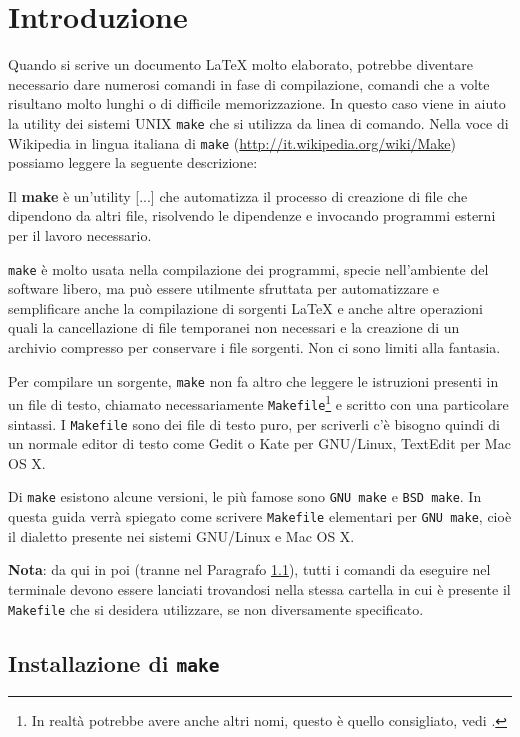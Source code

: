\cleardoublepage
\chapter{Introduzione}
\label{cha:introduzione}

Quando si scrive un documento \LaTeX{}
molto elaborato, potrebbe diventare necessario dare numerosi comandi in fase di
compilazione, comandi che a volte risultano molto lunghi o di difficile
memorizzazione.  In questo caso viene in aiuto la utility dei sistemi UNIX
\verb|make| che si utilizza da linea di comando.  Nella voce di Wikipedia in
lingua italiana di \verb|make| (\url{http://it.wikipedia.org/wiki/Make})
possiamo leggere la seguente descrizione:
\begin{quoting}
  Il \textbf{make} è un'utility [...] che automatizza il processo di creazione
  di file che dipendono da altri file, risolvendo le dipendenze e invocando
  programmi esterni per il lavoro necessario.
\end{quoting}
\verb|make| è molto usata nella compilazione dei programmi, specie nell'ambiente
del software libero, ma può essere utilmente sfruttata per automatizzare e
semplificare anche la compilazione di sorgenti \LaTeX{}
e anche altre operazioni quali la cancellazione di file temporanei non necessari
e la creazione di un archivio compresso per conservare i file sorgenti.  Non ci
sono limiti alla fantasia.

Per compilare un sorgente, \verb|make| non fa altro che leggere le istruzioni
presenti in un file di testo, chiamato necessariamente
\verb|Makefile|\footnote{In realtà potrebbe avere anche altri nomi, questo è
  quello consigliato, vedi \textcite[12]{gnu:make}.}
e scritto con una particolare sintassi.  I \verb|Makefile| sono dei file di
testo puro, per scriverli c'è bisogno quindi di un normale editor di testo come
Gedit o Kate per GNU/Linux, TextEdit per Mac OS X.

Di \verb|make| esistono alcune versioni, le più famose sono \verb|GNU make| e
\verb|BSD make|.  In questa guida verrà spiegato come scrivere \verb|Makefile|
elementari per \verb|GNU make|, cioè il dialetto presente nei sistemi GNU/Linux
e Mac OS X.

\textbf{Nota}: da qui in poi (tranne nel Paragrafo \ref{sec:installazione}),
tutti i comandi da eseguire nel terminale devono essere lanciati trovandosi
nella stessa cartella in cui è presente il \verb|Makefile| che si desidera
utilizzare, se non diversamente specificato.


\section{Installazione di \texttt{make}}
\label{sec:installazione}

